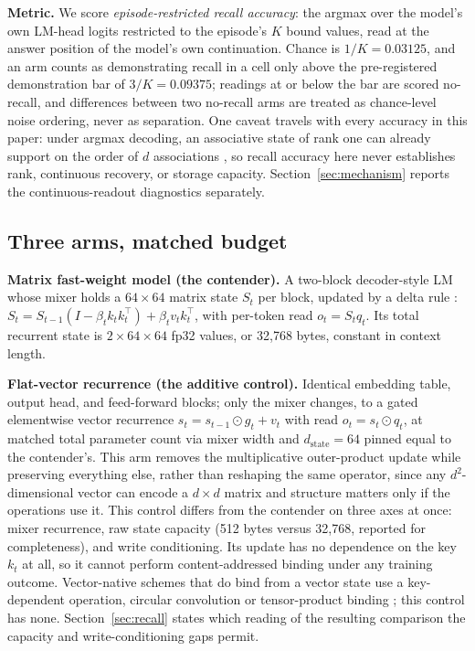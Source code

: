 \documentclass{article}
\begin{document}
\textbf{Metric.} We score \emph{episode-restricted recall accuracy}: the
argmax over the model's own LM-head logits restricted to the episode's $K$
bound values, read at the answer position of the model's own continuation.
Chance is $1/K = 0.03125$, and an arm counts as demonstrating recall in a
cell only above the pre-registered demonstration bar of $3/K = 0.09375$;
readings at or below the bar are scored no-recall, and differences between
two no-recall arms are treated as chance-level noise ordering, never as
separation. One caveat travels with every accuracy in this paper: under
argmax decoding, an associative state of rank one can already support on
the order of $d$ associations \citep{nichani2024understanding}, so recall
accuracy here never establishes rank, continuous recovery, or storage
capacity. Section~\ref{sec:mechanism} reports the continuous-readout
diagnostics separately.

\subsection{Three arms, matched budget}

\textbf{Matrix fast-weight model (the contender).} A two-block
decoder-style LM whose mixer holds
a $64 \times 64$ matrix state $S_t$ per block, updated by a delta rule
\citep{schlag2021linear, yang2024parallelizing}:
$S_t = S_{t-1}(I - \beta_t k_t k_t^{\top}) + \beta_t v_t k_t^{\top}$, with
per-token read $o_t = S_t q_t$. Its total recurrent state is
$2 \times 64 \times 64$ fp32 values, or 32{,}768 bytes, constant in context
length. %

\textbf{Flat-vector recurrence (the additive control).} Identical
embedding table, output head, and feed-forward blocks; only the mixer
changes, to a gated elementwise vector recurrence
$s_t = s_{t-1} \odot g_t + v_t$ with read $o_t = s_t \odot q_t$, at matched
total parameter count via mixer width and $d_{\mathrm{state}} = 64$ pinned
equal to the contender's. This arm removes the multiplicative
outer-product update while preserving everything else, rather than
reshaping the same operator, since any $d^2$-dimensional vector can encode
a $d \times d$ matrix and structure matters only if the operations use it.
This control differs from the contender on three axes at once: mixer
recurrence, raw state capacity (512 bytes versus 32{,}768,
reported for completeness), and write conditioning. Its update has no
dependence on the key $k_t$ at all, so it cannot perform
content-addressed binding under any training outcome. Vector-native
schemes that do bind from a vector state use a key-dependent operation,
circular convolution \citep{plate1995holographic} or tensor-product
binding \citep{smolensky1990tensor}; this control has none.
Section~\ref{sec:recall} states which reading of the resulting
comparison the capacity and write-conditioning gaps permit.
\end{document}
